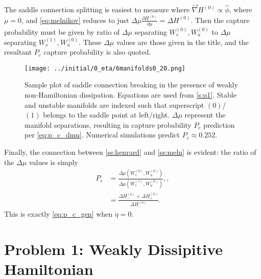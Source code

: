 \documentclass[
        fleqn,
        usenatbib,
    ]{mnras}
\newcommand*{\pd}[2]{\frac{\partial#1}{\partial#2}}
\newcommand*{\p}[1]{\left(#1\right)}
\begin{document}
The saddle connection splitting is easiest to measure where $\vec{\nabla}H^{(0)}
\propto \hat{\phi}$, where $\dot{\mu} = 0$, and \autoref{eq:melnikov} reduces to
just $\Delta \mu \pd{H^{(0)}}{\mu} = \Delta H^{(0)}$. Then the capture
probability must be given by ratio of $\Delta \mu$ separating $W_s^{(0)},
W_u^{(0)}$ to $\Delta \mu$ separating $W_s^{(1)}, W_u^{(0)}$. These $\Delta \mu$
values are those given in the title, and the resultant $P_c$ capture probability
is also quoted.
\begin{figure}[t]
    \centering
    \texttt{[image: ../initial/0\_eta/6manifolds0\_20.png]}
    \caption{Sample plot of saddle connection breaking in the presence of weakly
    non-Hamiltonian dissipation. Equations are used from \autoref{s:p1}. Stable
    and unstable manifolds are indexed such that superscript $(0)$/$(1)$
    belongs to the saddle point at left/right. $\Delta \mu$ represent the
    manifold separations, resulting in capture probability $P_c$
    prediction per \autoref{eq:p_c_dmu}. Numerical simulations predict $P_c
    \approx 0.252$.}\label{fig:0_6manifolds}
\end{figure}

Finally, the connection between \autoref{ss:henrard} and \autoref{ss:meln} is
evident: the ratio of the $\Delta \mu$ values is simply
\begin{align}
    P_c &= \frac{\Delta \mu(W_s^{(0)}, W_u^{(0)})}{
            \Delta \mu\p{W_s^{(1)}, W_u^{(0)}}},\label{eq:p_c_dmu},\\
        &= \frac{\Delta H^{(0)}_- + \Delta H^{(0)}_+}{\Delta H^{(0)}_-}.
\end{align}
This is exactly \autoref{eq:p_c_gen} when $\dot{\eta} = 0$.

\section{Problem 1: Weakly Dissipitive Hamiltonian}\label{s:p1}
\end{document}

